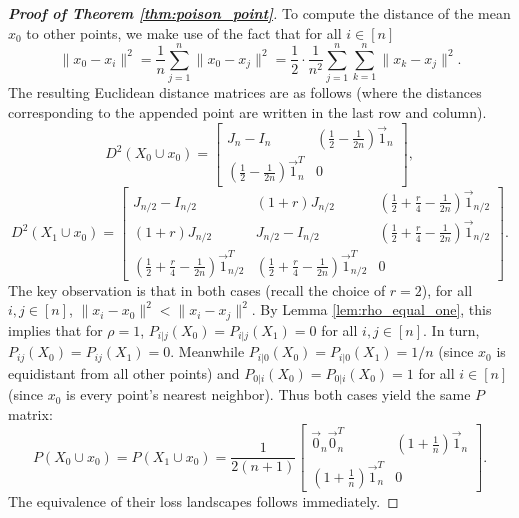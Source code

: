 \begin{proof}[\textbf{Proof of Theorem \ref{thm:poison_point}}]
To compute the distance of the mean \(x_0\) to other points, we make use of the fact that for all \(i\in [n]\)%
\[\|x_0 - x_i\|^2 = \frac{1}{n} \sum_{j=1}^n \|x_0 - x_j\|^2 = \frac{1}{2}\cdot \frac{1}{n^2}\sum_{j=1}^n \sum_{k=1}^n \|x_k - x_j\|^2.\]
The resulting Euclidean distance matrices are as follows (where the distances corresponding to the appended point are written in the last row and column).%
 \[D^2(X_0\cup x_0) = \begin{bmatrix}
     J_{n} - I_n & (\frac{1}{2} - \frac{1}{2n})  \vec{1}_n \\
   (\frac{1}{2} - \frac{1}{2n})  \vec{1}_n^T  & 0
 \end{bmatrix},\]
 \[D^2(X_1\cup x_0) = \begin{bmatrix}
       J_{n/2} - I_{n/2 } & (1+r) J_{n/2}  & (\frac{1}{2} + \frac{r}{4 } - \frac{1}{2n}) \vec{1}_{n/2} \\
       (1+r) J_{n/2} &  J_{n/2} - I_{n/2}   & (\frac{1}{2} + \frac{r}{4 } - \frac{1}{2n}) \vec{1}_{n/2}  \\
       (\frac{1}{2} + \frac{r}{4 } - \frac{1}{2n}) \vec{1}_{n/2}^T & (\frac{1}{2} + \frac{r}{4 } - \frac{1}{2n}) \vec{1}_{n/2}^T & 0  
   \end{bmatrix}.\]
The key observation is that in both cases (recall the choice of \(r=2\)), for all \(i,j\in [n]\), \(\|x_i - x_0\|^2 < \|x_i-x_j\|^2\). %
By Lemma \ref{lem:rho_equal_one}, this implies that for \(\rho = 1\), \(P_{i|j}(X_0) = P_{i|j}(X_1) = 0\) for all \(i,j \in [n]\). In turn, \(P_{ij}(X_0) = P_{ij}(X_1) = 0\). Meanwhile \(P_{i|0}(X_0) = P_{i|0}(X_1) = 1/n\) (since \(x_0\) is equidistant from all other points) and \(P_{0|i}(X_0) = P_{0|i}(X_0) = 1\) for all \(i\in [n]\) (since \(x_0\) is every point's nearest neighbor). Thus both cases yield the same \(P\) matrix:
\[P(X_0\cup x_0) = P(X_1\cup x_0) =  \frac{1}{2(n+1)}\begin{bmatrix}
  \vec{0}_{n}\vec{0}_{n}^T & (1 + \frac{1}{n})\vec{1}_{n} \\
 (1 + \frac{1}{n})\vec{1}_{n}^T  & 0
\end{bmatrix}.\]
The equivalence of their loss landscapes follows immediately.
\end{proof}

